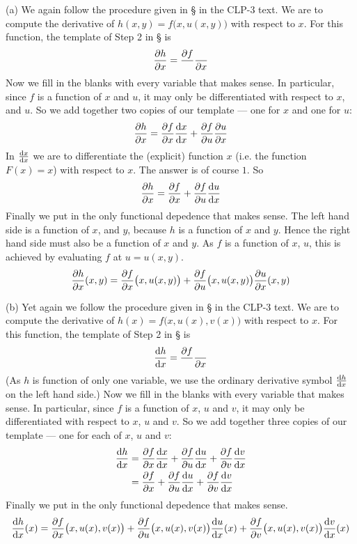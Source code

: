 \begin{solution}
(a)
We again follow the procedure given in 
\S{} in the CLP-3 text. We are to compute the
derivative of $h(x,y)=f\big(x,u(x,y)\big)$ with respect to 
$x$. For this function, the template of Step 2 in 
\S{} is
\begin{equation*}
\pdiff{h}{x}=\frac{\partial f}{ }\frac{ }{\partial x}
\end{equation*}
Now we fill in the blanks with every variable that makes sense. In 
particular, since $f$ is a function of $x$ and $u$, it may only be 
differentiated with respect to $x$, and $u$. So we add together
two copies of our template --- one for $x$ and one for $u$:
\begin{align*}
\pdiff{h}{x}=\pdiff{f}{x}\diff{x}{x}
             +\pdiff{f}{u}\pdiff{u}{x}
\end{align*}
In $\diff{x}{x}$ we are to differentiate the (explicit) function $x$
(i.e. the function $F(x)=x$) with respect to $x$. The answer is of 
course $1$. So 
\begin{align*}
\pdiff{h}{x}=\pdiff{f}{x}
             +\pdiff{f}{u}\diff{u}{x}
\end{align*} 
Finally we put in the only functional depedence that makes sense. 
The left hand side is a function of $x$, and $y$, because $h$
is a function of $x$ and $y$. Hence the right hand side must 
also be a function of $x$ and $y$. As $f$ is a
function of $x$, $u$, this is achieved by evaluating $f$ at 
$u=u(x,y)$.
\begin{align*}
\pdiff{h}{x}(x,y)
=\pdiff{f}{x}\big(x,u(x,y)\big)
+\pdiff{f}{u}\big(x,u(x,y)\big)
\pdiff{u}{x}(x,y)
\end{align*}


(b) Yet again we follow the procedure given in 
\S{} in the CLP-3 text. We are to compute the
derivative of $h(x)=f\big(x,u(x),v(x)\big)$ with respect to 
$x$. For this function, the template of Step 2 in 
\S{} is
\begin{equation*}
\diff{h}{x}=\frac{\partial f}{ }\frac{ }{\partial x}
\end{equation*}
(As $h$ is function of only one variable, we use the ordinary derivative
symbol $\diff{h}{x}$ on the left hand side.)
Now we fill in the blanks with every variable that makes sense. In 
particular, since $f$ is a function of $x$, $u$ and $v$, it may only be 
differentiated with respect to $x$, $u$ and $v$. So we add together
three copies of our template --- one for each of $x$, $u$ and $v$:
\begin{align*}
\diff{h}{x}&=\pdiff{f}{x}\diff{x}{x}
             +\pdiff{f}{u}\diff{u}{x}
             +\pdiff{f}{v}\diff{v}{x} \\
            &=\pdiff{f}{x}
             +\pdiff{f}{u}\diff{u}{x}
             +\pdiff{f}{v}\diff{v}{x}
\end{align*}
Finally we put in the only functional depedence that makes sense. 
\begin{align*}
\diff{h}{x}(x)
=\pdiff{f}{x}\big(x,u(x),v(x)\big)
+\pdiff{f}{u}\big(x,u(x),v(x)\big)
\diff{u}{x}(x)
+\pdiff{f}{v}\big(x,u(x),v(x)\big)
\diff{v}{x}(x)
\end{align*}


\end{solution}

